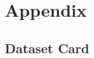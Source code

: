 \appendix

\setcounter{table}{0}
\renewcommand{\thetable}{A\arabic{table}}
\renewcommand{\theHtable}{appendix.\arabic{table}}
\setcounter{figure}{0}
\renewcommand{\thefigure}{A\arabic{figure}}
\renewcommand{\theHfigure}{appendix.\arabic{figure}}
\setcounter{algorithm}{0}
\renewcommand{\thealgorithm}{A\arabic{algorithm}}
\renewcommand{\theHalgorithm}{appendix.\arabic{algorithm}}

\section{Appendix}
\label{app:appendix}

\subsection{Dataset Card}
\label{app:datacard}

